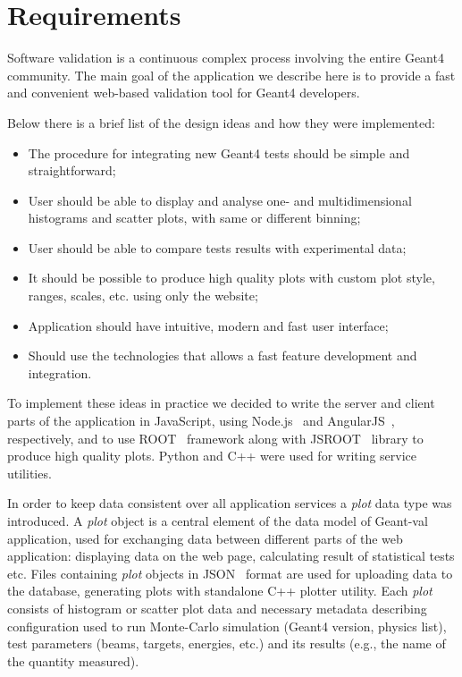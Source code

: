 \section{Requirements}
\label{sec:requirements}

Software validation is a continuous complex process involving the entire Geant4 community. The main goal of the application we describe here is to provide a fast and convenient web-based validation tool for Geant4 developers.

Below there is a brief list of the design ideas
and how they were implemented:
\begin{itemize}
    \item The procedure for integrating new Geant4 tests should be simple and straightforward;
    \item User should be able to display and analyse one- and multidimensional histograms and scatter plots, with same or different binning;
    \item User should be able to compare tests results with experimental data;
    \item It should be possible to produce high quality plots with custom plot style, ranges, scales, etc. using only the website;
    \item Application should have intuitive, modern and fast user interface;
    \item Should use the technologies that allows a fast feature development and integration.
\end{itemize}

To implement these ideas in practice we decided to write the server and client parts of the application in JavaScript, using Node.js~\cite{NodeJS} and AngularJS~\cite{AngularJS}, respectively, and to use ROOT~\cite{ROOT} framework along with JSROOT~\cite{JSROOT} library to produce high quality plots. Python and C++ were used for writing service utilities.

In order to keep data consistent over all application services a \textit{plot} data type was introduced. A \textit{plot} object is a central element of the data model of \textsf{Geant-val} application, used for exchanging data between different parts of the web application: displaying data on the web page, calculating result of statistical tests etc. Files containing \textit{plot} objects in JSON~\cite{json} format are used for uploading data to the database, generating plots with standalone C++ plotter utility. 
Each \textit{plot} consists of histogram or scatter plot data and necessary metadata describing configuration used to run Monte-Carlo simulation (Geant4 version, physics list), test parameters (beams, targets, energies, etc.) and its results (e.g., the name of the quantity measured).

